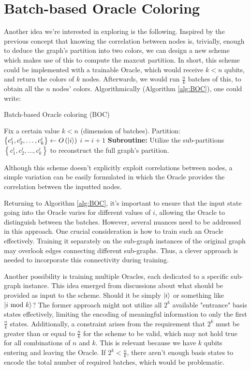 \section{Batch-based Oracle Coloring}
\label{section:Oracle_Coloring}
Another idea we're interested in exploring is the following. Inspired by the previous concept that knowing the correlation between nodes is, trivially, enough to deduce the graph's partition into two colors, we can design a new scheme which makes use of this to compute the \acrshort{maxcut} partition. In short, this scheme could be implemented with a trainable Oracle, which would receive $k < n$ qubits, and return the colors of $k$ nodes. Afterwards, we would run $\frac{n}{k}$ batches of this, to obtain all the $n$ nodes' colors. Algorithmically (Algorithm \ref{alg:BOC}), one could write:

\begin{algorithm}
\caption{Batch-based Oracle coloring (BOC)}\label{alg:BOC}
\begin{algorithmic}
\State Fix a certain value $k < n$ (dimension of batches).
    \State Partition: $\left\{c^i_1, c^i_2, \ldots, c^i_k\right\} \gets O\left(\ket{i}\right)$
    \State $i = i + 1$
\EndFor
\State \textbf{Subroutine:} Utilize the sub-partitions $\left\{c^i_1, c^i_2, \ldots, c^i_k\right\}$ to reconstruct the full graph's partition.
\end{algorithmic}
\end{algorithm}
Although this scheme doesn't explicitly exploit correlations between nodes, a simple variation can be easily formulated in which the Oracle provides the correlation between the inputted nodes.

Returning to Algorithm \ref{alg:BOC}, it's important to ensure that the input state going into the Oracle varies for different values of $i$, allowing the Oracle to distinguish between the batches. However, several nuances need to be addressed in this approach. One crucial consideration is how to train such an Oracle effectively. Training it separately on the sub-graph instances of the original graph may overlook edges connecting different sub-graphs. Thus, a clever approach is needed to incorporate this connectivity during training. 

Another possibility is training multiple Oracles, each dedicated to a specific sub-graph instance. This idea emerged from discussions about what should be provided as input to the scheme. Should it be simply $\ket{i}$ or something like $\ket{i \text{ mod } k}$? The former approach might not utilize all $2^k$ available "entrance" basis states effectively, limiting the encoding of meaningful information to only the first $\frac{n}{k}$ states. Additionally, a constraint arises from the requirement that $2^k$ must be greater than or equal to $\frac{n}{k}$ for the scheme to be valid, which may not hold true for all combinations of $n$ and $k$. This is relevant because we have \( k \) qubits entering and leaving the Oracle. If \( 2^k < \frac{n}{k} \), there aren't enough basis states to encode the total number of required batches, which would be problematic.

